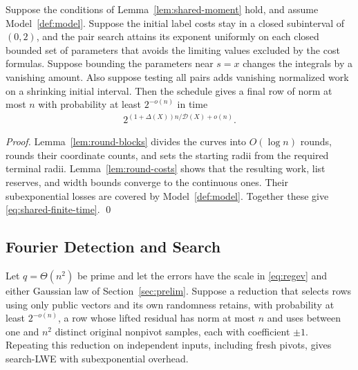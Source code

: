 \documentclass[runningheads,envcountsame,envcountsect,orivec]{llncs}
\begin{document}
\begin{lemma}
\label{lem:shared-finite}
Suppose the conditions of Lemma~\ref{lem:shared-moment} hold,
and assume Model~\ref{def:model}. Suppose the initial label costs
stay in a closed subinterval of $(0,2)$, and the pair search
attains its exponent uniformly on each closed bounded set of
parameters that avoids the limiting values excluded by the
cost formulas.
Suppose bounding the parameters near $s=x$ changes the integrals
by a vanishing amount. Also suppose testing all pairs adds
vanishing normalized work on a shrinking initial interval.
Then the schedule gives a final row of norm at most $n$
with probability at least $2^{-o(n)}$ in time
\begin{align}
 2^{(1+\Delta(X))n/\mathcal D(X)+o(n)} .
 \label{eq:shared-finite-time}
\end{align}
\end{lemma}

\begin{proof}
Lemma~\ref{lem:round-blocks} divides the curves into
$O(\log n)$ rounds, rounds their coordinate counts, and
sets the starting radii from the required terminal radii.
Lemma~\ref{lem:round-costs} shows that the resulting work,
list reserves, and width bounds converge to the continuous
ones. Their subexponential losses are covered by
Model~\ref{def:model}. Together these give
\eqref{eq:shared-finite-time}.
\qed
\end{proof}

\subsection{Fourier Detection and Search}
\label{sec:terminal}

\begin{lemma}
\label{lem:terminal}
Let $q=\Theta(n^2)$ be prime and let the errors have the scale in
\eqref{eq:regev} and either Gaussian law of Section~\ref{sec:prelim}.
Suppose a reduction that
selects rows using only public vectors and its own randomness retains,
with probability at least $2^{-o(n)}$, a row whose lifted residual
has norm at most $n$ and uses between one and $n^2$ distinct
original nonpivot samples, each with coefficient $\pm1$.
Repeating this reduction on independent inputs, including fresh
pivots, gives search-LWE with subexponential overhead.
\end{lemma}
\end{document}
